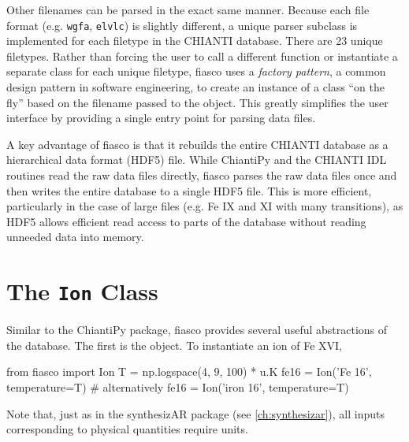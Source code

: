 Other filenames can be parsed in the exact same manner. Because each file format (e.g. \texttt{wgfa}, \texttt{elvlc}) is slightly different, a unique parser subclass is implemented for each filetype in the CHIANTI database. There are 23 unique filetypes. Rather than forcing the user to call a different function or instantiate a separate class for each unique filetype, fiasco uses a \textit{factory pattern}, a common design pattern in software engineering, to create an instance of a class ``on the fly'' based on the filename passed to the  object. This greatly simplifies the user interface by providing a single entry point for parsing data files.

A key advantage of fiasco is that it rebuilds the entire CHIANTI database as a hierarchical data format (HDF5) file. While ChiantiPy and the CHIANTI IDL routines read the raw data files directly, fiasco parses the raw data files once and then writes the entire database to a single HDF5 file. This is more efficient, particularly in the case of large files (e.g. Fe IX and XI with many transitions), as HDF5 allows efficient read access to parts of the database without reading unneeded data into memory. 

\section{The \texttt{Ion} Class}\label{sec:fiasco-ion}

Similar to the ChiantiPy package, fiasco provides several useful abstractions of the database. The first is the  object. To instantiate an ion of Fe XVI,
\begin{pyverbatim}[appendix1][baselinestretch=1,xleftmargin=3em]
from fiasco import Ion
T = np.logspace(4, 9, 100) * u.K
fe16 = Ion('Fe 16', temperature=T)
# alternatively
fe16 = Ion('iron 16', temperature=T)
\end{pyverbatim}
Note that, just as in the synthesizAR package (see \autoref{ch:synthesizar}), all inputs corresponding to physical quantities require units.

